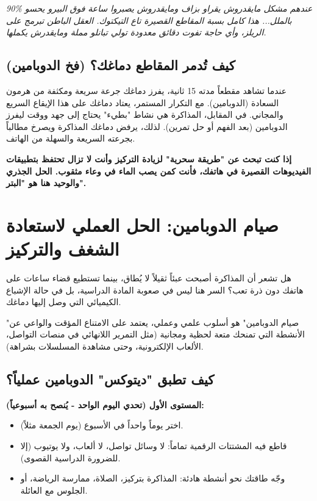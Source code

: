 \documentclass[12pt,a4paper]{book}
\newcommand{\quoteAr}[1]{%
	\begin{myquote}
		\itshape #1
	\end{myquote}
}
\newcommand{\importantAr}[1]{%
	\begin{important}
		\bfseries #1
	\end{important}
}
\begin{document}
	\quoteAr{90\% عندهم مشكل مايقدروش يقراو بزاف ومايقدروش يصبروا ساعة فوق البيرو يحسو بالملل... هذا كامل بسبة المقاطع القصيرة تاع التيكتوك. العقل الباطن تبرمج على الريلز، وأي حاجة تفوت دقائق معدودة تولي تبانلو مملة ومايقدرش يكملها.}
	
	\subsection*{كيف تُدمر المقاطع دماغك؟ (فخ الدوبامين)}
	عندما تشاهد مقطعاً مدته 15 ثانية، يفرز دماغك جرعة سريعة ومكثفة من هرمون السعادة (الدوبامين). مع التكرار المستمر، يعتاد دماغك على هذا الإيقاع السريع والمجاني. في المقابل، المذاكرة هي نشاط "بطيء" يحتاج إلى جهد ووقت ليفرز الدوبامين (بعد الفهم أو حل تمرين). لذلك، يرفض دماغك المذاكرة ويصرخ مطالباً بجرعته السريعة والسهلة من الهاتف. 
	
	\importantAr{إذا كنت تبحث عن "طريقة سحرية" لزيادة التركيز وأنت لا تزال تحتفظ بتطبيقات الفيديوهات القصيرة في هاتفك، فأنت كمن يصب الماء في وعاء مثقوب. الحل الجذري والوحيد هنا هو "البتر".}
	
	
	
	\section{صيام الدوبامين: الحل العملي لاستعادة الشغف والتركيز}
	
	هل تشعر أن المذاكرة أصبحت عبئاً ثقيلاً لا يُطاق، بينما تستطيع قضاء ساعات على هاتفك دون ذرة تعب؟ السر هنا ليس في صعوبة المادة الدراسية، بل في حالة الإشباع الكيميائي التي وصل إليها دماغك. 
	
	"صيام الدوبامين" هو أسلوب علمي وعملي، يعتمد على الامتناع المؤقت والواعي عن الأنشطة التي تمنحك متعة لحظية ومجانية (مثل التمرير اللانهائي في منصات التواصل، الألعاب الإلكترونية، وحتى مشاهدة المسلسلات بشراهة). 
	
	
	\subsection{كيف تطبق "ديتوكس" الدوبامين عملياً؟}
	
	\textbf{المستوى الأول (تحدي اليوم الواحد - يُنصح به أسبوعياً):}
	\begin{itemize}
		\item اختر يوماً واحداً في الأسبوع (يوم الجمعة مثلاً).
		\item قاطع فيه المشتتات الرقمية تماماً: لا وسائل تواصل، لا ألعاب، ولا يوتيوب (إلا للضرورة الدراسية القصوى).
		\item وجّه طاقتك نحو أنشطة هادئة: المذاكرة بتركيز، الصلاة، ممارسة الرياضة، أو الجلوس مع العائلة.
	\end{itemize}
	
\end{document}
